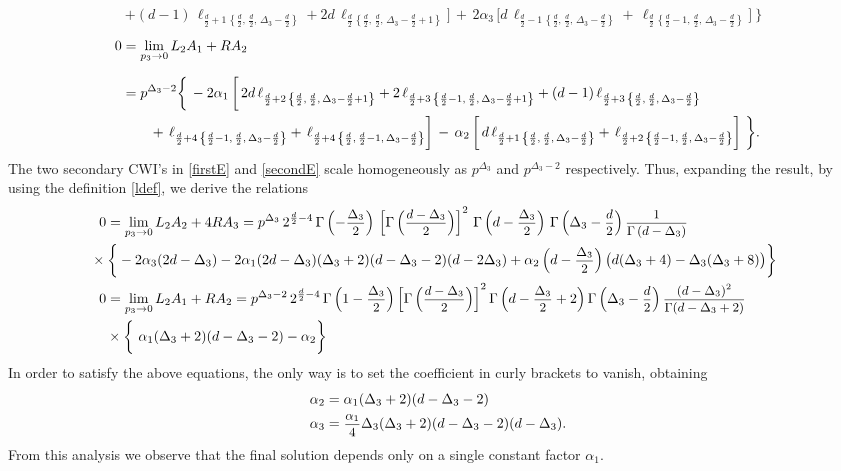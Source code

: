 \documentclass[a4paper,11pt,openright,twoside]{book}
\let\a=\alpha   \let\b=\beta   \let\g=\gamma   \let\d=\delta
\let\G=\Gamma  \let\D=\Delta \let\Q=\Theta  \let\L=\Lambda
\newcommand{\sdfrac}[2]{\mbox{\small$\displaystyle\frac{#1}{#2}$}}
\numberwithin{equation}{section}
\begin{document}
{{{\begin{align}
	&+(d-1)\,\ell_{\frac{d}{2}+1\,\left\{\frac{d}{2},\,\frac{d}{2},\,\D_3-\frac{d}{2}\right\}}+2d\,\ell_{\frac{d}{2}\,\left\{\frac{d}{2},\,\frac{d}{2},\,\D_3-\frac{d}{2}+1\right\}}\bigg]\,+\,2\a_3\,\bigg[d\,\ell_{\frac{d}{2}-1\,\left\{\frac{d}{2},\,\frac{d}{2},\,\D_3-\frac{d}{2}\right\}}+\,\ell_{\frac{d}{2}\,\left\{\frac{d}{2}-1,\,\frac{d}{2},\,\D_3-\frac{d}{2}\right\}}\bigg]\ \bigg\}\label{firstE}
\end{align}
\begin{align}
	0&=\lim_{p_3\to0}L_2A_1+RA_2\notag\\[1.5ex]
	&=p^{\D_3-2}\bigg\{\, -2\a_1\,\bigg[\,2d\,\ell_{\frac{d}{2}+2\,\left\{\frac{d}{2},\,\frac{d}{2},\,\D_3-\frac{d}{2}+1\right\}}+2\,\ell_{\frac{d}{2}+3\,\left\{\frac{d}{2}-1,\,\frac{d}{2},\,\D_3-\frac{d}{2}+1\right\}}+(d-1)\,\ell_{\frac{d}{2}+3\,\left\{\frac{d}{2},\,\frac{d}{2},\,\D_3-\frac{d}{2}\right\}}\notag\\
	&\qquad+\,\ell_{\frac{d}{2}+4\,\left\{\frac{d}{2}-1,\,\frac{d}{2},\,\D_3-\frac{d}{2}\right\}}+\,\ell_{\frac{d}{2}+4\,\left\{\frac{d}{2},\,\frac{d}{2}-1,\,\D_3-\frac{d}{2}\right\}}\bigg]\,-\,\a_2\,\bigg[\,d\,\ell_{\frac{d}{2}+1\,\left\{\frac{d}{2},\,\frac{d}{2},\,\D_3-\frac{d}{2}\right\}}+\,\ell_{\frac{d}{2}+2\,\left\{\frac{d}{2}-1,\,\frac{d}{2},\,\D_3-\frac{d}{2}\right\}}\bigg]\ \bigg\}.\label{secondE}
\end{align}
The two secondary CWI's in \eqref{firstE} and \eqref{secondE} scale homogeneously as $p^{\D_3}$ and $p^{\D_3-2}$ respectively. Thus, expanding the result, by using the definition \eqref{ldef}, we derive the relations
\begin{align}
	0&=\lim_{p_3\to0}L_2A_2+4RA_3=p^{\D_3}\,2^{\frac{d}{2}-4}\,\G\left(-\sdfrac{\D_3}{2}\right)\,\left[\G\left(\sdfrac{d-\D_3}{2}\right)\right]^2\,\G\left(d-\sdfrac{\D_3}{2}\right)\,\G\left(\D_3-\sdfrac{d}{2}\right)\sdfrac{1}{\G\left(d-\D_3\right)}\notag\\
	&\hspace{-0.4cm}\times\bigg\{-2\a_3(2d-\D_3)-2\a_1(2d-\D_3)(\D_3+2)(d-\D_3-2)(d-2\D_3)+\a_2\left(d-\sdfrac{\D_3}{2}\right)\big(d(\D_3+4)-\D_3(\D_3+8)\big)\bigg\}\\
	0&=\lim_{p_3\to0}L_2A_1+RA_2=p^{\D_3-2}\,2^{\frac{d}{2}-4}\,\G\left(1-\sdfrac{\D_3}{2}\right)\left[\G\left(\sdfrac{d-\D_3}{2}\right)\right]^2\G\left(d-\sdfrac{\D_3}{2}+2\right)\G\left(\D_3-\sdfrac{d}{2}\right)\sdfrac{(d-\D_3)^2}{\G(d-\D_3+2)}\notag\\
	&\times\bigg\{\ \a_1(\D_3+2)(d-\D_3-2)-\a_2\bigg\}
\end{align}
In order to satisfy the above equations, the only way is to set the coefficient in curly brackets to vanish, obtaining
\begin{align}
	\a_2&=\a_1(\D_3+2)(d-\D_3-2)\\
	\a_3&=\sdfrac{\a_1}{4}\D_3(\D_3+2)(d-\D_3-2)(d-\D_3).
\end{align}
From this analysis we observe that the final solution depends only on a single constant factor $\a_1$. 

}}}
\end{document}
